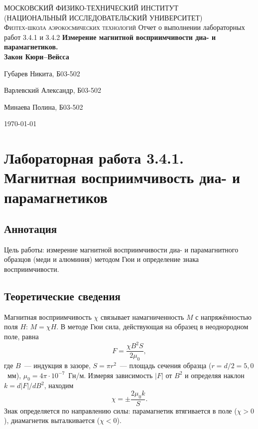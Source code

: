 \documentclass[a4paper,12pt]{article}
\begin{document}
	
	\begin{titlepage}
		\centering
		{\scshape\Large МОСКОВСКИЙ ФИЗИКО-ТЕХНИЧЕСКИЙ ИНСТИТУТ \\
			(НАЦИОНАЛЬНЫЙ ИССЛЕДОВАТЕЛЬСКИЙ УНИВЕРСИТЕТ)\\
			Физтех-школа аэрокосмических технологий}
		\vspace{4cm}
		{\LARGE Отчет о выполнении лабораторных работ 3.4.1 и 3.4.2}
		\vspace{1cm}
		{\huge\bf Измерение магнитной восприимчивости диа- и парамагнетиков.\\
			Закон Кюри--Вейсса}
		\vfill
		\begin{flushright}
			{\LARGE Губарев Никита, Б03-502}

			{\LARGE Варлевский Александр, Б03-502}
			
			{\LARGE Минаева Полина, Б03-502}
		\end{flushright}
		\vfill
		\today
	\end{titlepage}
	
	\tableofcontents
	\newpage
	
	\section{Лабораторная работа 3.4.1. Магнитная восприимчивость диа- и парамагнетиков}
	
	\subsection{Аннотация}
	Цель работы: измерение магнитной восприимчивости диа- и парамагнитного образцов (меди и алюминия) методом Гюи и определение знака восприимчивости.
	
	\subsection{Теоретические сведения}
	Магнитная восприимчивость $\chi$ связывает намагниченность $M$ с напряжённостью поля $H$: $M=\chi H$. В методе Гюи сила, действующая на образец в неоднородном поле, равна
	\begin{equation}
		F = \frac{\chi B^2 S}{2\mu_0},
	\end{equation}
	где $B$~--- индукция в зазоре, $S=\pi r^2$~--- площадь сечения образца ($r = d/2 = 5{,}0$~мм), $\mu_0 = 4\pi\cdot10^{-7}$~Гн/м. Измеряя зависимость $|F|$ от $B^2$ и определяя наклон $k = d|F|/dB^2$, находим
	\begin{equation}
		\chi = \pm \frac{2\mu_0 k}{S}.
	\end{equation}
	Знак определяется по направлению силы: парамагнетик втягивается в поле ($\chi > 0$), диамагнетик выталкивается ($\chi < 0$).
	
\end{document}
